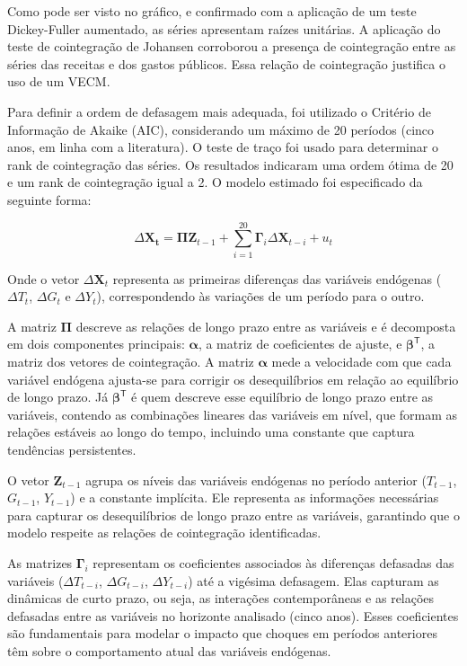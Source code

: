 \documentclass[a4paper, 12pt, openany, oneside, brazil]{abntex2}
\begin{document}
Como pode ser visto no gráfico, e confirmado com a aplicação de um teste Dickey-Fuller aumentado, as séries apresentam raízes unitárias. A aplicação do teste de cointegração de Johansen corroborou a presença de cointegração entre as séries das receitas e dos gastos públicos. Essa relação de cointegração justifica o uso de um VECM.

Para definir a ordem de defasagem mais adequada, foi utilizado o Critério de Informação de Akaike (AIC), considerando um máximo de 20 períodos (cinco anos, em linha com a literatura). O teste de traço foi usado para determinar o rank de cointegração das séries. Os resultados indicaram uma ordem ótima de 20 e um rank de cointegração igual a 2. O modelo estimado foi especificado da seguinte forma:



\begin{equation}
	\Delta \mathbf{X_t} = \mathbf{\Pi} \mathbf{Z}_{t-1} + \sum_{i=1}^{20} \mathbf{\Gamma}_i \Delta \mathbf{X}_{t-i} + u_t
\end{equation}


Onde o vetor $\Delta \mathbf{X}_t$ representa as primeiras diferenças das variáveis endógenas ($\Delta T_t$, $\Delta G_t$ e $\Delta Y_t$), correspondendo às variações de um período para o outro.

A matriz $\mathbf{\Pi}$ descreve as relações de longo prazo entre as variáveis e é decomposta em dois componentes principais: $\mathbf{\alpha}$, a matriz de coeficientes de ajuste, e $\mathbf{\beta}^\mathsf{T}$, a matriz dos vetores de cointegração. A matriz $\mathbf{\alpha}$ mede a velocidade com que cada variável endógena ajusta-se para corrigir os desequilíbrios em relação ao equilíbrio de longo prazo. Já $\mathbf{\beta}^\mathsf{T}$ é quem descreve esse equilíbrio de longo prazo entre as variáveis, contendo as combinações lineares das variáveis em nível, que formam as relações estáveis ao longo do tempo, incluindo uma constante que captura tendências persistentes.

O vetor $\mathbf{Z}_{t-1}$ agrupa os níveis das variáveis endógenas no período anterior ($T_{t-1}$, $G_{t-1}$, $Y_{t-1}$) e a constante implícita. Ele representa as informações necessárias para capturar os desequilíbrios de longo prazo entre as variáveis, garantindo que o modelo respeite as relações de cointegração identificadas.

As matrizes $\mathbf{\Gamma}_i$ representam os coeficientes associados às diferenças defasadas das variáveis ($\Delta T_{t-i}$, $\Delta G_{t-i}$, $\Delta Y_{t-i}$) até a vigésima defasagem. Elas capturam as dinâmicas de curto prazo, ou seja, as interações contemporâneas e as relações defasadas entre as variáveis no horizonte analisado (cinco anos). Esses coeficientes são fundamentais para modelar o impacto que choques em períodos anteriores têm sobre o comportamento atual das variáveis endógenas.
\end{document}
